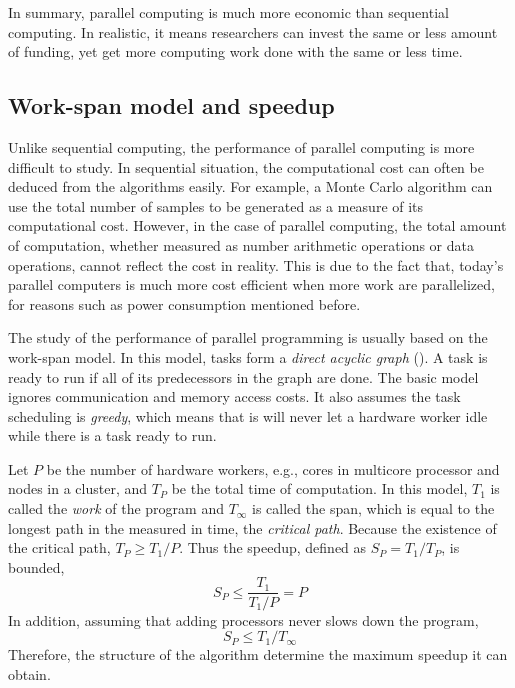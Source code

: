 In summary, parallel computing is much more economic than sequential
computing. In realistic, it means researchers can invest the same or less
amount of funding, yet get more computing work done with the same or less
time.

\subsection{Work-span model and speedup}
\label{sub:Work-span model and speedup}

Unlike sequential computing, the performance of parallel computing is more
difficult to study. In sequential situation, the computational cost can often
be deduced from the algorithms easily. For example, a Monte Carlo algorithm
can use the total number of samples to be generated as a measure of its
computational cost. However, in the case of parallel computing, the total
amount of computation, whether measured as number arithmetic operations or
data operations, cannot reflect the cost in reality. This is due to the fact
that, today's parallel computers is much more cost efficient when more work
are parallelized, for reasons such as power consumption mentioned before.

The study of the performance of parallel programming is usually based on the
work-span model. In this model, tasks form a \emph{direct acyclic graph}
(\dag). A task is ready to run if all of its predecessors in the graph are
done. The basic model ignores communication and memory access costs. It also
assumes the task scheduling is \emph{greedy}, which means that is will never
let a hardware worker idle while there is a task ready to run.

Let $P$ be the number of hardware workers, e.g., cores in multicore processor
and nodes in a cluster, and $T_P$ be the total time of computation. In this
model, $T_1$ is called the \emph{work} of the program and $T_{\infty}$ is
called the span, which is equal to the longest path in the \dag measured in
time, the \emph{critical path}. Because the existence of the critical path,
$T_P \ge T_1/P$. Thus the speedup, defined as $S_P = T_1/T_P$, is bounded,
\begin{equation}
  S_P \le \frac{T_1}{T_1/P} = P
\end{equation}
In addition, assuming that adding processors never slows down the program,
\begin{equation}
  S_P \le T_1/T_{\infty}
\end{equation}
Therefore, the structure of the algorithm determine the maximum speedup it can
obtain.

